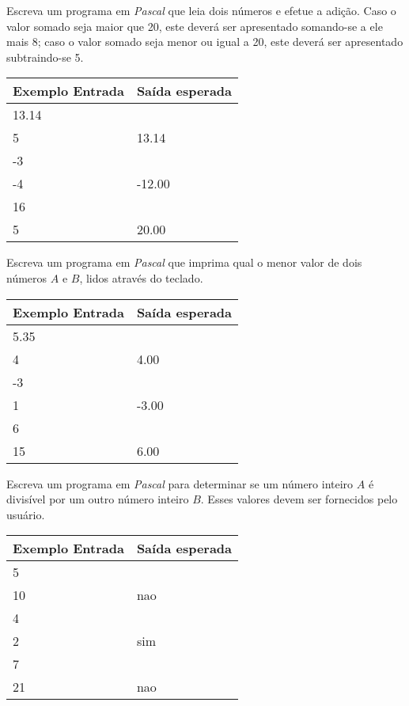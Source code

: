 \item Escreva um programa em \emph{Pascal} que leia dois números e efetue a 
adição. Caso o valor somado seja maior que 20, este deverá ser apresentado 
somando-se a ele mais 8; caso o valor somado seja menor ou igual a 20, 
este deverá ser apresentado subtraindo-se 5.

\begin{center}
\begin{tabular}{|l|l|} \hline
Exemplo Entrada & Saída esperada \\ \hline
13.14                &                \\
5                &    13.14            \\ \hline
-3                &                \\
-4                &   -12.00             \\ \hline
16                &                \\
5                &    20.00            \\ \hline
\end{tabular}
\end{center}

\item Escreva um programa em \emph{Pascal} que imprima qual o menor valor de 
dois números $A$ e $B$, lidos através do teclado.

\begin{center}
\begin{tabular}{|l|l|} \hline
Exemplo Entrada & Saída esperada \\ \hline
5.35                &                \\
4                & 4.00               \\ \hline
-3                &                \\
1                & -3.00               \\ \hline
6                &                \\ 
15                & 6.00               \\ \hline
\end{tabular}
\end{center}

\item Escreva um programa em \emph{Pascal} para determinar se um número 
inteiro $A$ é divisível por um outro número inteiro $B$. Esses valores 
devem ser fornecidos pelo usuário.

\begin{center}
\begin{tabular}{|l|l|} \hline
Exemplo Entrada & Saída esperada \\ \hline
5                &                \\
10               & nao               \\ \hline
4                &                \\ 
2                & sim               \\ \hline
7                &                \\ 
21               & nao              \\ \hline
\end{tabular}
\end{center}

